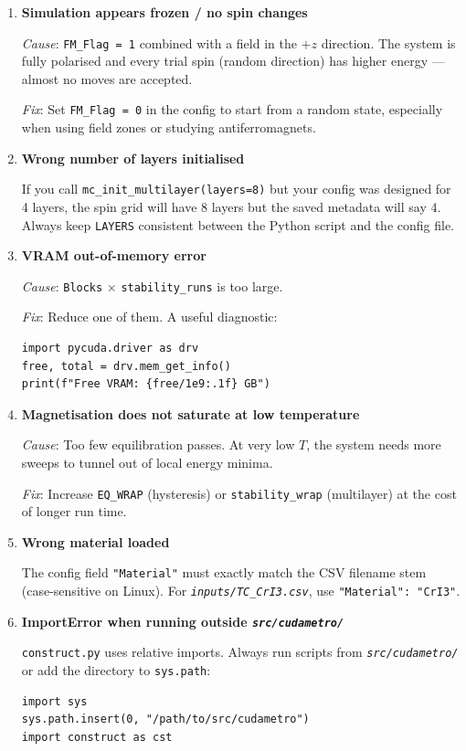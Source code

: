 \documentclass[12pt,a4paper]{article}
\newcommand{\code}[1]{\texttt{#1}}
\newcommand{\file}[1]{\texttt{\textit{#1}}}
\newcommand{\param}[1]{\texttt{#1}}
\begin{document}
\begin{enumerate}

\item \textbf{Simulation appears frozen / no spin changes}

  \textit{Cause}: \code{FM\_Flag = 1} combined with a field in the $+z$
  direction. The system is fully polarised and every trial spin
  (random direction) has higher energy --- almost no moves are accepted.

  \textit{Fix}: Set \code{FM\_Flag = 0} in the config to start from a random
  state, especially when using field zones or studying antiferromagnets.

\item \textbf{Wrong number of layers initialised}

  If you call \code{mc\_init\_multilayer(layers=8)} but your config was designed
  for 4 layers, the spin grid will have 8 layers but the saved metadata will say
  4. Always keep \code{LAYERS} consistent between the Python script and the config
  file.

\item \textbf{VRAM out-of-memory error}

  \textit{Cause}: \param{Blocks} $\times$ \param{stability\_runs} is too large.

  \textit{Fix}: Reduce one of them. A useful diagnostic:
  \begin{lstlisting}[style=python]
import pycuda.driver as drv
free, total = drv.mem_get_info()
print(f"Free VRAM: {free/1e9:.1f} GB")
  \end{lstlisting}

\item \textbf{Magnetisation does not saturate at low temperature}

  \textit{Cause}: Too few equilibration passes. At very low $T$, the system
  needs more sweeps to tunnel out of local energy minima.

  \textit{Fix}: Increase \param{EQ\_WRAP} (hysteresis) or \param{stability\_wrap}
  (multilayer) at the cost of longer run time.

\item \textbf{Wrong material loaded}

  The config field \code{"Material"} must exactly match the CSV filename stem
  (case-sensitive on Linux). For \file{inputs/TC\_CrI3.csv}, use
  \code{"Material": "CrI3"}.

\item \textbf{ImportError when running outside \file{src/cudametro/}}

  \code{construct.py} uses relative imports. Always run scripts from
  \file{src/cudametro/} or add the directory to \code{sys.path}:
  \begin{lstlisting}[style=python]
import sys
sys.path.insert(0, "/path/to/src/cudametro")
import construct as cst
  \end{lstlisting}

\end{enumerate}
\end{document}
